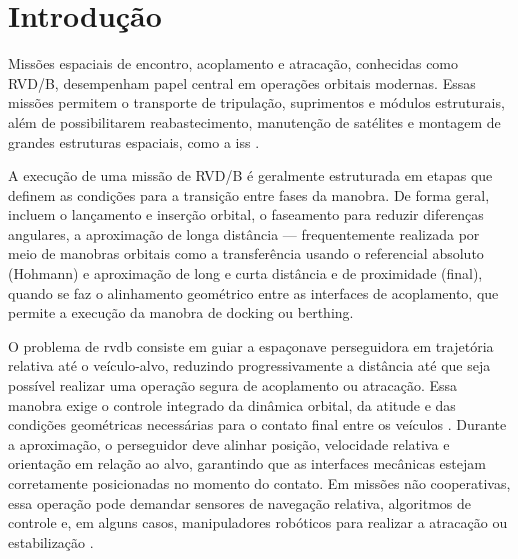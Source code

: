 \chapter{Introdução} 
\label{sec_Introducao_Dissertacao_orientador}


Missões espaciais de encontro, acoplamento e atracação, conhecidas como RVD/B, desempenham papel central em operações orbitais modernas. Essas missões permitem o transporte de tripulação, suprimentos e módulos estruturais, além de possibilitarem reabastecimento, manutenção de satélites e montagem de grandes estruturas espaciais, como a \gls{iss} \cite{nasaISS}.


A execução de uma missão de RVD/B é geralmente estruturada em etapas que definem as condições para a transição entre fases da manobra. De forma geral, incluem o lançamento e inserção orbital, o faseamento para reduzir diferenças angulares, a aproximação de longa distância — frequentemente realizada por meio de manobras orbitais como a transferência usando o referencial absoluto (Hohmann) e aproximação de long e  curta distância e de proximidade (final), quando se faz o alinhamento geométrico entre as interfaces de acoplamento, que permite a execução da manobra de docking ou berthing.

O problema de \gls{rvdb} consiste em guiar a espaçonave perseguidora em trajetória relativa até o veículo-alvo, reduzindo progressivamente a distância até que seja possível realizar uma operação segura de acoplamento ou atracação. Essa manobra exige o controle integrado da dinâmica orbital, da atitude e das condições geométricas necessárias para o contato final entre os veículos \cite{curtis2013orbital}.
Durante a aproximação, o perseguidor deve alinhar posição, velocidade relativa e orientação em relação ao alvo, garantindo que as interfaces mecânicas estejam corretamente posicionadas no momento do contato. Em missões não cooperativas, essa operação pode demandar sensores de navegação relativa, algoritmos de controle e, em alguns casos, manipuladores robóticos para realizar a atracação ou estabilização \cite{flores2014review}.

